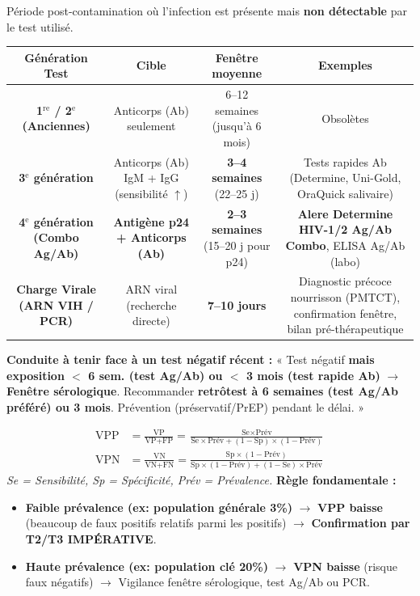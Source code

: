 \documentclass[11pt]{article}
\begin{document}
\begin{definition}
Période post-contamination où l'infection est présente mais \textbf{non détectable} par le test utilisé.
\begin{center}
\begin{tabular}{|c|c|c|c|}\hline
\textbf{Génération Test} & \textbf{Cible} & \textbf{Fenêtre moyenne} & \textbf{Exemples} \\ \hline
\textbf{1$^{\text{re}}$ / 2$^{\text{e}}$ (Anciennes)} & Anticorps (Ab) seulement & 6--12 semaines (jusqu'à 6 mois) & Obsolètes \\ \hline
\textbf{3$^{\text{e}}$ génération} & Anticorps (Ab) IgM + IgG (sensibilité $\uparrow$) & \textbf{3--4 semaines} (22--25 j) & Tests rapides Ab (Determine, Uni-Gold, OraQuick salivaire) \\ \hline
\textbf{4$^{\text{e}}$ génération (Combo Ag/Ab)} & \textbf{Antigène p24 + Anticorps (Ab)} & \textbf{2--3 semaines} (15--20 j pour p24) & \textbf{Alere Determine HIV-1/2 Ag/Ab Combo}, ELISA Ag/Ab (labo) \\ \hline
\textbf{Charge Virale (ARN VIH / PCR)} & ARN viral (recherche directe) & \textbf{7--10 jours} & Diagnostic précoce nourrisson (PMTCT), confirmation fenêtre, bilan pré-thérapeutique \\ \hline
\end{tabular}
\end{center}
\textbf{Conduite à tenir face à un test négatif récent :} « Test négatif \textbf{mais exposition $<$ 6 sem. (test Ag/Ab) ou $<$ 3 mois (test rapide Ab)} $\rightarrow$ \textbf{Fenêtre sérologique}. Recommander \textbf{retrôtest à 6 semaines (test Ag/Ab préféré) ou 3 mois}. Prévention (préservatif/PrEP) pendant le délai. »
\end{definition}

\begin{propriete}
\begin{align*}
\text{VPP} &= \frac{\text{VP}}{\text{VP}+\text{FP}} = \frac{\text{Se} \times \text{Prév}}{\text{Se} \times \text{Prév} + (1-\text{Sp}) \times (1-\text{Prév})} \\
\text{VPN} &= \frac{\text{VN}}{\text{VN}+\text{FN}} = \frac{\text{Sp} \times (1-\text{Prév})}{\text{Sp} \times (1-\text{Prév}) + (1-\text{Se}) \times \text{Prév}}
\end{align*}
\textit{Se = Sensibilité, Sp = Spécificité, Prév = Prévalence.}
\textbf{Règle fondamentale :}
\begin{itemize}
    \item \textbf{Faible prévalence (ex: population générale 3\%)} $\rightarrow$ \textbf{VPP baisse} (beaucoup de faux positifs relatifs parmi les positifs) $\rightarrow$ \textbf{Confirmation par T2/T3 IMPÉRATIVE}.
    \item \textbf{Haute prévalence (ex: population clé 20\%)} $\rightarrow$ \textbf{VPN baisse} (risque faux négatifs) $\rightarrow$ Vigilance fenêtre sérologique, test Ag/Ab ou PCR.
\end{itemize}
\end{propriete}
\end{document}
